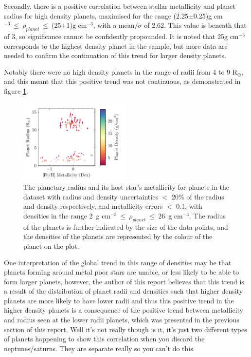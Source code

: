 \documentclass[a4paper,twocolumn,12pt]{article}
\begin{document}
Secondly, there is a positive correlation between stellar metallicity and planet radius for high density planets, maximised for the range (2.25$\pm$0.25)g cm$^{-3}~\leq~\rho_{planet}~\leq~$(25$\pm$1)g cm$^{-3}$, with a mean/$\sigma$ of 2.62. This value is beneath that of 3, so significance cannot be confidently propounded. It is noted that 25g cm$^{-3}$ corresponds to the highest density planet in the sample, but more data are needed to confirm the continuation of this trend for larger density planets.

Notably there were no high density planets in the range of radii from 4 to 9 R$_{\oplus}$, and this meant that this positive trend was not continuous, as demonstrated in figure \ref{figure: Fe/H vs Radius for high density planets}.

\begin{figure}[h!]
    \centering
    \includegraphics[width=0.5\textwidth]{Graphs/FeH vs Radius Planet Plot Density 2 to 26.pdf}
    \caption{The planetary radius and its host star's metallicity for  planets in the dataset with radius and density uncertainties $<$ 20\% of the radius and density respectively, and metallicity errors $<$ 0.1, with densities in the range 2~g cm$^{-3}~\leq~\rho_{planet}~\leq~$26~g cm$^{-3}$. The radius of the planets is further indicated by the size of the data points, and the densities of the planets are represented by the colour of the planet on the plot.}
    \label{figure: Fe/H vs Radius for high density planets}
\end{figure}


One interpretation of the global trend in this range of densities may be that planets forming around metal poor stars are unable, or less likely to be able to form larger planets, however, the author of this report believes that this trend is a result of the distribution of planet radii and densities such that higher density planets are more likely to have lower radii and thus this positive trend in the higher density planets is a consequence of the positive trend between metallicity and radius seen at the lower radii planets, which was presented in the previous section of this report.
Well it's not really though is it, it's just two different types of planets happening to show this correlation when you discard the neptunes/saturns. They are separate really so you can't do this.
\end{document}
